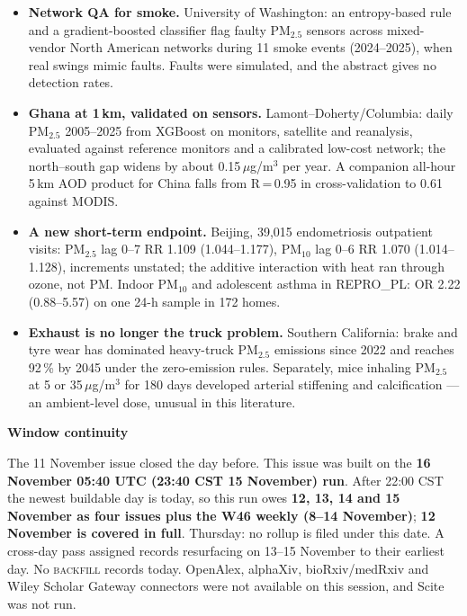 \documentclass[10pt]{article}
\begin{document}
\footnotesize
\begin{itemize}

\item \textbf{Network QA for smoke.} University of Washington: an entropy-based rule and a gradient-boosted classifier flag faulty PM$_{2.5}$ sensors across mixed-vendor North American networks during 11 smoke events (2024--2025), when real swings mimic faults. Faults were simulated, and the abstract gives no detection rates.

\item \textbf{Ghana at 1\,km, validated on sensors.} Lamont--Doherty/Columbia: daily PM$_{2.5}$ 2005--2025 from XGBoost on monitors, satellite and reanalysis, evaluated against reference monitors and a calibrated low-cost network; the north--south gap widens by about 0.15\,$\mu$g/m$^3$ per year. A companion all-hour 5\,km AOD product for China falls from R\,=\,0.95 in cross-validation to 0.61 against MODIS.

\item \textbf{A new short-term endpoint.} Beijing, 39,015 endometriosis outpatient visits: PM$_{2.5}$ lag 0--7 RR 1.109 (1.044--1.177), PM$_{10}$ lag 0--6 RR 1.070 (1.014--1.128), increments unstated; the additive interaction with heat ran through ozone, not PM. Indoor PM$_{10}$ and adolescent asthma in REPRO\_PL: OR 2.22 (0.88--5.57) on one 24-h sample in 172 homes.

\item \textbf{Exhaust is no longer the truck problem.} Southern California: brake and tyre wear has dominated heavy-truck PM$_{2.5}$ emissions since 2022 and reaches 92\,\% by 2045 under the zero-emission rules. Separately, mice inhaling PM$_{2.5}$ at 5 or 35\,$\mu$g/m$^3$ for 180 days developed arterial stiffening and calcification --- an ambient-level dose, unusual in this literature.

\end{itemize}

\vspace{2mm}

\begin{keybox}
{\sffamily\bfseries\footnotesize\color{Deep}Window continuity}\\[1.2mm]
{\fontsize{7.2}{8.8}\selectfont
The 11 November issue closed the day before. This issue was built on the \textbf{16 November 05:40 UTC (23:40 CST 15 November) run}. After 22:00 CST the newest buildable day is today, so this run owes \textbf{12, 13, 14 and 15 November as four issues plus the W46 weekly (8--14 November)}; \textbf{12 November is covered in full}. Thursday: no rollup is filed under this date. A cross-day pass assigned records resurfacing on 13--15 November to their earliest day. No \textsc{backfill} records today. OpenAlex, alphaXiv, bioRxiv/medRxiv and Wiley Scholar Gateway connectors were not available on this session, and Scite was not run.\par}
\end{keybox}
\end{document}
